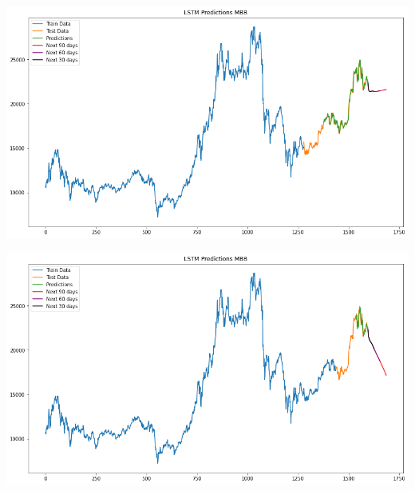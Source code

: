 \documentclass[conference]{IEEEtran}
\begin{document}
\begin{minipage}{0.23\textwidth}
    \centering
    \includegraphics[width=\linewidth]{images/LSTM/LSTM_MBB_82.png}
    \label{fig:image1}
\end{minipage}
\hfill
\begin{minipage}{0.23\textwidth}
    \centering
    \includegraphics[width=\linewidth]{images/LSTM/LSTM_MBB_91.png}
    \label{fig:image2}
\end{minipage}
\end{document}
